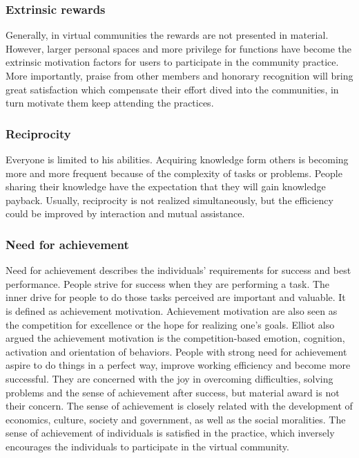 \documentclass{elsarticle}
\begin{document}
\subsubsection{Extrinsic rewards}
\label{sec:extrinsic-rewards}


   Generally, in virtual communities the rewards are
  not presented in material. However, larger personal spaces and more
  privilege for functions have become the extrinsic motivation factors
  for users to participate in the community practice.  More
  importantly,  praise from other members and
honorary recognition will bring great satisfaction which compensate
their effort dived into the communities, in turn motivate them keep
attending the practices\cite{Zhugea}.

\subsubsection{Reciprocity}
\label{sec:reciprocity}

Everyone is limited to his abilities. Acquiring knowledge form others
is becoming more and more frequent because of the complexity of tasks
or problems. People sharing their knowledge have the expectation that
they will gain knowledge payback.  Usually, reciprocity is not realized simultaneously, but the
efficiency could be improved by interaction and mutual assistance.

\subsubsection{Need for achievement}
\label{sec:need-achievement}


 Need for achievement  describes the individuals’ requirements for
success and best performance.  People  strive for success when they are performing a
task. The inner drive for people to do those tasks perceived
are important and valuable\cite{mitzel1982encyclopedia}. It is defined as achievement
motivation.  Achievement
motivation are also seen as the competition for excellence or the hope for realizing
one’s goals\cite{clark1994emc}.  
Elliot also argued  the achievement motivation is the
competition-based emotion, cognition, activation and orientation of
behaviors\cite{elliot1999aaa}.  People
with strong need for achievement aspire to do things in a perfect way,
improve working efficiency and become more successful\cite{mcclelland1976am}. They are
concerned with the joy in overcoming difficulties, solving problems
and the sense of achievement after success, but material award is not
their concern. The sense of achievement is closely related with the
development of economics, culture, society and government, as well as the
social moralities. The sense of achievement of individuals is
satisfied in the practice, which inversely encourages the individuals
to participate in the virtual community. 
\end{document}
